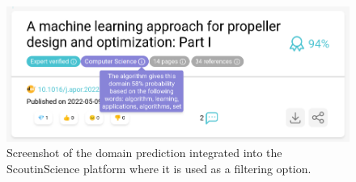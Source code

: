 \begin{figure}
    \centering
    \includegraphics[width=0.7\linewidth]{figures/dashboard-domains.png}
    \captionsetup{width=.9\linewidth}
    \caption{Screenshot of the domain prediction integrated into the ScoutinScience platform where it is used as a filtering option.}
    \label{fig:dashboard-domains}
\end{figure}
